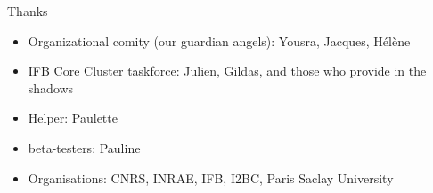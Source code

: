 \begin{frame}{Thanks}
\begin{itemize}
    \item Organizational comity (our guardian angels): Yousra, Jacques, Hélène
    \item IFB Core Cluster taskforce: Julien, Gildas, and those who provide in the shadows
    \item Helper: Paulette
    \item beta-testers: Pauline
    \item Organisations: CNRS, INRAE, IFB, I2BC, Paris Saclay University
\end{itemize}
\end{frame}
